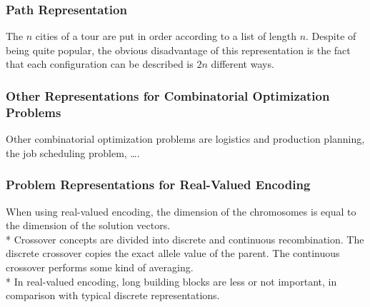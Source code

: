 \documentclass[12pt]{article}
\begin{document}
\subsubsection{Path Representation}
The $n$ cities of a tour are put in order according to a list of length $n$. Despite of being quite popular, the obvious disadvantage of this representation is the fact that each configuration can be described is $2n$ different ways.
\subsubsection{Other Representations for Combinatorial Optimization Problems}
Other combinatorial optimization problems are logistics and production planning, the job scheduling problem, \dots.
\subsubsection{Problem Representations for Real-Valued Encoding}
When using real-valued encoding, the dimension of the chromosomes is equal to the dimension of the solution vectors.\\*
Crossover concepts are divided into discrete and continuous recombination. The discrete crossover copies the exact allele value of the parent. The continuous crossover performs some kind of averaging.\\*
In real-valued encoding, long building blocks are less or not important, in comparison with typical discrete representations.
\end{document}
